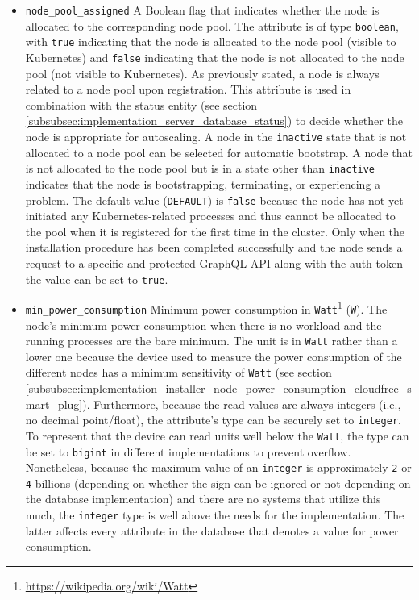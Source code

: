 \begin{itemize}
  \item \texttt{node\_pool\_assigned}
    \newline
    A Boolean flag that indicates whether the node is allocated to the
    corresponding node pool.
    \newline
    The attribute is of type \texttt{boolean}, with \texttt{true} indicating
    that the node is allocated to the node pool (visible to Kubernetes) and
    \texttt{false} indicating that the node is not allocated to the node pool (not
    visible to Kubernetes).
    \newline
    As previously stated, a node is always related to a node pool upon registration.
    This attribute is used in combination with the status entity (see section \ref{subsubsec:implementation_server_database_status})
    to decide whether the node is appropriate for autoscaling. A node in the \texttt{inactive}
    state that is not allocated to a node pool can be selected for automatic
    bootstrap. A node that is not allocated to the node pool but is in a state other
    than \texttt{inactive} indicates that the node is bootstrapping, terminating,
    or experiencing a problem.
    \newline
    The default value (\texttt{DEFAULT}) is \texttt{false} because the node has not
    yet initiated any Kubernetes-related processes and thus cannot be allocated to
    the pool when it is registered for the first time in the cluster. Only when
    the installation procedure has been completed successfully and the node
    sends a request to a specific and protected GraphQL API along with the auth
    token the value can be set to \texttt{true}.

  \item \texttt{min\_power\_consumption}
    \newline
    Minimum power consumption in \texttt{Watt}\footnote{\url{https://wikipedia.org/wiki/Watt}}
    (\texttt{W}).
    \newline
    The node's minimum power consumption when there is no workload and the running
    processes are the bare minimum.
    \newline
    The unit is in \texttt{Watt} rather than a lower one because the device used
    to measure the power consumption of the different nodes has a minimum sensitivity
    of \texttt{Watt} (see section \ref{subsubsec:implementation_installer_node_power_consumption_cloudfree_smart_plug}).
    Furthermore, because the read values are always integers (i.e., no decimal point/float),
    the attribute's type can be securely set to \texttt{integer}. To represent that
    the device can read units well below the \texttt{Watt}, the type can be set to
    \texttt{bigint} in different implementations to prevent overflow. Nonetheless,
    because the maximum value of an \texttt{integer} is approximately \texttt{2}
    or \texttt{4} billions (depending on whether the sign can be ignored or not
    depending on the database implementation) and there are no systems that utilize
    this much, the \texttt{integer} type is well above the needs for the implementation.
    \newline
    The latter affects every attribute in the database that denotes a value for
    power consumption.


\end{itemize}
